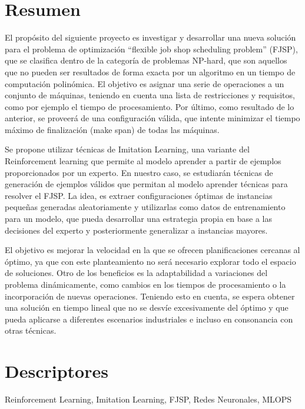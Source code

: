 \section*{Resumen}
El propósito del siguiente proyecto es investigar y desarrollar una nueva solución para el 
problema de optimización “flexible job shop scheduling problem” (FJSP), que se clasifica dentro 
de la categoría de problemas NP-hard, que son aquellos que no pueden ser resultados de forma 
exacta por un algoritmo en un tiempo de computación polinómica. El objetivo es asignar una 
serie de operaciones a un conjunto de máquinas, teniendo en cuenta una lista de restricciones 
y requisitos, como por ejemplo el tiempo de procesamiento. Por último, como resultado de lo 
anterior, se proveerá de una configuración válida, que intente minimizar el tiempo máximo de 
finalización (make span) de todas las máquinas.\medskip 

Se propone utilizar técnicas de Imitation Learning, una variante del Reinforcement learning 
que permite al modelo aprender a partir de ejemplos proporcionados por un experto. En nuestro 
caso, se estudiarán técnicas de generación de ejemplos válidos que permitan al modelo aprender 
técnicas para resolver el FJSP. La idea, es extraer configuraciones óptimas de instancias 
pequeñas generadas aleatoriamente y utilizarlas como datos de entrenamiento para un modelo, 
que pueda desarrollar una estrategia propia en base a las decisiones del experto y posteriormente 
generalizar a instancias mayores.\medskip 

El objetivo es mejorar la velocidad en la que se ofrecen planificaciones cercanas al óptimo, 
ya que con este planteamiento no será necesario explorar todo el espacio de soluciones. Otro 
de los beneficios es la adaptabilidad a variaciones del problema dinámicamente, como cambios 
en los tiempos de procesamiento o la incorporación de nuevas operaciones. Teniendo esto en 
cuenta, se espera obtener una solución en tiempo lineal que no se desvíe excesivamente del 
óptimo y que pueda aplicarse a diferentes escenarios industriales e incluso en consonancia 
con otras técnicas.

\section*{Descriptores}
Reinforcement Learning, Imitation Learning, FJSP, Redes Neuronales, MLOPS
\pagebreak